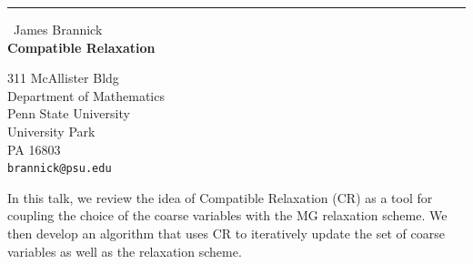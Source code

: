 \documentclass{report}
\begin{document}
\begin{center}
\rule{6in}{1pt} \
{\large James Brannick \\
{\bf Compatible Relaxation}}

311 McAllister Bldg \\ Department of Mathematics \\ Penn State University \\ University Park \\ PA 16803
\\
{\tt brannick@psu.edu}\end{center}

In this talk, we review the idea of Compatible Relaxation (CR) as a tool
for coupling the choice of the coarse variables with the MG relaxation
scheme. We then develop an algorithm that uses CR to iteratively update
the set of coarse variables as well as the relaxation scheme.
\end{document}

